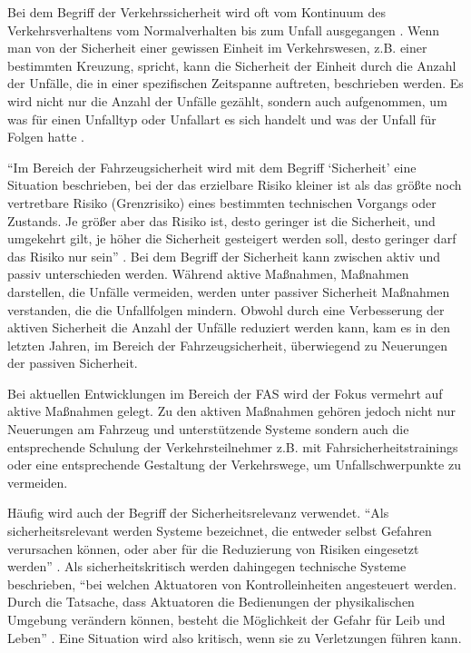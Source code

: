 Bei dem Begriff der Verkehrssicherheit wird oft vom Kontinuum des Verkehrsverhaltens vom Normalverhalten bis zum Unfall ausgegangen \parencite[S. 9]{Hoffmann.26.04.2013}. Wenn man von der Sicherheit einer gewissen Einheit im Verkehrswesen, z.B. einer bestimmten Kreuzung, spricht, kann die Sicherheit der Einheit durch die Anzahl der Unfälle, die in einer spezifischen Zeitspanne auftreten, beschrieben werden. Es wird nicht nur die Anzahl der Unfälle gezählt, sondern auch aufgenommen, um was für einen Unfalltyp oder Unfallart es sich handelt und was der Unfall für Folgen hatte \parencite[S. 3]{Antoniou.21.06.2018}.

\enquote{Im Bereich der Fahrzeugsicherheit wird mit dem Begriff \enquote{Sicherheit} eine Situation beschrieben, bei der das erzielbare Risiko kleiner ist als das größte noch vertretbare Risiko (Grenzrisiko) eines bestimmten technischen Vorgangs oder Zustands. Je größer aber das Risiko ist, desto geringer ist die Sicherheit, und umgekehrt gilt, je höher die Sicherheit gesteigert werden soll, desto geringer darf das Risiko nur sein} \parencite[S. 743]{Burg.2017}. Bei dem Begriff der Sicherheit kann zwischen aktiv und passiv unterschieden werden. Während aktive Maßnahmen, Maßnahmen darstellen, die Unfälle vermeiden, werden unter passiver Sicherheit Maßnahmen verstanden, die die Unfallfolgen mindern. Obwohl durch eine Verbesserung der aktiven Sicherheit die Anzahl der Unfälle reduziert werden kann, kam es in den letzten Jahren, im Bereich der Fahrzeugsicherheit, überwiegend zu Neuerungen der passiven Sicherheit.

Bei aktuellen Entwicklungen im Bereich der \acs{FAS} wird der Fokus vermehrt auf aktive Maßnahmen gelegt. Zu den aktiven Maßnahmen gehören jedoch nicht nur Neuerungen am Fahrzeug und unterstützende Systeme sondern auch die entsprechende Schulung der Verkehrsteilnehmer z.B. mit Fahrsicherheitstrainings oder eine entsprechende Gestaltung der Verkehrswege, um Unfallschwerpunkte zu vermeiden.

Häufig wird auch der Begriff der Sicherheitsrelevanz verwendet. \enquote{Als sicherheitsrelevant werden Systeme bezeichnet, die entweder selbst Gefahren verursachen können, oder aber für die Reduzierung von Risiken eingesetzt werden} \parencite[S. 44]{Hillenbrand.2012}. Als sicherheitskritisch werden dahingegen technische Systeme beschrieben, \enquote{bei welchen Aktuatoren von Kontrolleinheiten angesteuert werden. Durch die Tatsache, dass Aktuatoren die Bedienungen der physikalischen Umgebung verändern können, besteht die Möglichkeit der Gefahr für Leib und Leben} \parencite[S. 44]{Hillenbrand.2012}. Eine Situation wird also kritisch, wenn sie zu Verletzungen führen kann.

